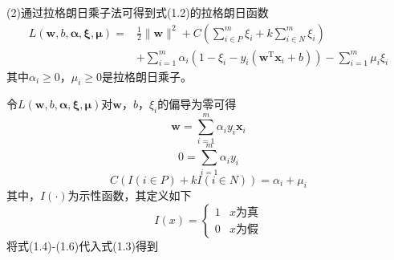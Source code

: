 \documentclass[a4paper,utf8]{article}
\begin{document}
	\noindent
   (2)通过拉格朗日乘子法可得到式(1.2)的拉格朗日函数
   \begin{equation}
	\begin{split}
		L(\bm{w},b,\bm{\alpha},\bm{\xi},\bm{\mu})=& \frac{1}{2}\lVert\bm{w}\rVert^2 + C(\sum_{i\in P}^m\xi_i+k\sum_{i\in N}^m\xi_i)\\
		& +\sum_{i=1}^m\alpha_i(1-\xi_i-y_i(\bm{w}^\mathrm{T}\bm{x}_i+b)) - \sum_{i=1}^m\mu_i\xi_i
	\end{split}
	\end{equation}
	其中$\alpha_i\geq 0$，$\mu_i\geq 0$是拉格朗日乘子。

	令$L(\bm{w},b,\bm{\alpha},\bm{\xi},\bm{\mu})$对$\bm{w}$，$b$，$\xi_i$的偏导为零可得
	\begin{equation}
		\bm{w}=\sum_{i=1}^m \alpha_i y_i \bm{x}_i
	\end{equation}
	\begin{equation}
		0=\sum_{i=1}^m \alpha_i y_i
	\end{equation}
	\begin{equation}
		C(I(i\in P)+kI(i\in N))=\alpha_i+\mu_i
	\end{equation}
	其中，$I(\cdot)$为示性函数，其定义如下
	\begin{equation*}
		I(x)=
		\begin{cases}
			1 & x\text{为真} \\
			0 & x\text{为假}
		\end{cases}
	\end{equation*}
	将式(1.4)-(1.6)代入式(1.3)得到%
	
\end{document}
